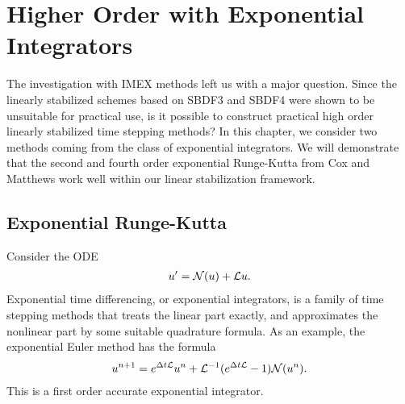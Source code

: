 \chapter{Higher Order with Exponential Integrators}
The investigation with IMEX methods left us with a major question. Since the linearly stabilized schemes based on SBDF3 and SBDF4 were shown to be unsuitable for practical use, is it possible to construct practical high order linearly stabilized time stepping methods? In this chapter, we consider two methods coming from the class of exponential integrators. We will demonstrate that the second and fourth order exponential Runge-Kutta from Cox and Matthews \cite{cox2002exponential} work well within our linear stabilization framework.

\section{Exponential Runge-Kutta}
\label{sect:exp rk}
Consider the ODE
\begin{align}
u'= \mathcal{N}(u) + \mathcal{L} u.
\end{align}
Exponential time differencing, or exponential integrators, is a family of time stepping methods that treats the linear part exactly, and approximates the nonlinear part by some suitable quadrature formula. As an example, the exponential Euler method has the formula
\begin{align}
u^{n+1} 
= e^{\Delta t\mathcal{L}} u^n + \mathcal{L}^{-1}(e^{\Delta t\mathcal{L}}  -1) \mathcal{N}(u^n).
\end{align}
This is a first order accurate exponential integrator. 
 
